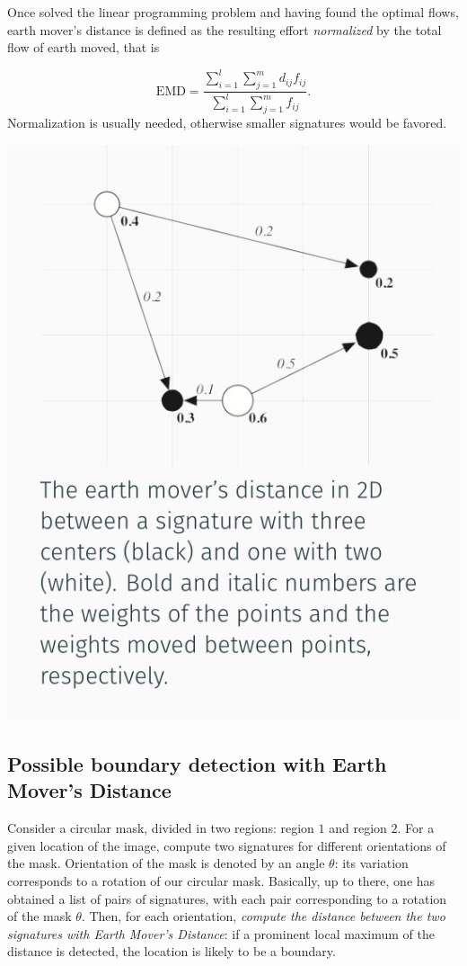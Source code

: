 \documentclass[10pt]{report}
\begin{document}
Once solved the linear programming problem and having found the optimal
flows, earth mover's distance is defined as the resulting effort
\emph{normalized} by the total flow of earth moved, that is

\[\mbox{EMD} = \frac{\sum_{i=1}^l \sum_{j=1}^m d_{ij}f_{ij}}{\sum_{i=1}^l \sum_{j=1}^m f_{ij}}.\]
Normalization is usually needed, otherwise smaller signatures would be
favored.

\begin{center}
\includegraphics[scale=0.3]{./pics/det/emd-explanation.jpg}
\end{center}

\subsection{Possible boundary detection with Earth Mover's Distance}
\label{sec:org710a5c6}
Consider a circular mask, divided in two regions: region \(1\) and
region \(2\). For a given location of the image, compute two signatures
for different orientations of the mask. Orientation of the mask is
denoted by an angle \(\theta\): its variation corresponds to a rotation
of our circular mask. Basically, up to there, one has obtained a list of
pairs of signatures, with each pair corresponding to a rotation of the
mask \(\theta\). Then, for each orientation, \emph{compute the distance
between the two signatures with Earth Mover's Distance}: if a prominent
local maximum of the distance is detected, the location is likely to be
a boundary.
\end{document}
